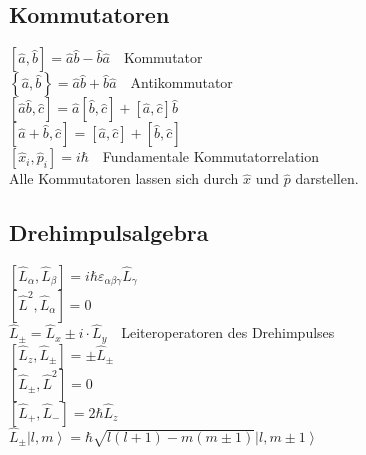\documentclass[8pt,a4paper]{extarticle}
\newcommand{\frml}[2]{$#1$~\hfill~#2\\}
\newcommand{\komut}[2]{\left[#1,#2 \right]}
\newcommand{\antikomut}[2]{\left\{#1,#2\right\}}
\newcommand{\ket}[1]{\left|#1\right\rangle}
\newcommand{\oper}[1]{\hat#1}
\begin{document}
\begin{multicols}{3}
\subsection{Kommutatoren}
\frml{\komut{\oper{a}}{\oper{b}} = \oper{a}\oper{b} - \oper{b}\oper{a}}{Kommutator}
\frml{\antikomut{\oper{a}}{\oper{b}} = \oper{a}\oper{b} + \oper{b}\oper{a}}{Antikommutator}
\frml{\komut{\oper{a}\oper{b}}{\oper{c}}= \oper{a}\komut{\oper{b}}{\oper{c}}+\komut{\oper{a}}{\oper{c}}\oper{b}}{}
\frml{\komut{\oper{a}+\oper{b}}{\oper{c}} = \komut{\oper{a}}{\oper{c}}+\komut{\oper{b}}{\oper{c}}}{}
\frml{\komut{\oper{x}_i}{\oper{p}_i} = i\hbar}{Fundamentale Kommutatorrelation}
Alle Kommutatoren lassen sich durch $\oper{x}$ und $\oper{p}$ darstellen.
\subsection{Drehimpulsalgebra}
\frml{\komut{\oper{L}_\alpha}{\oper{L}_\beta} =  i \hbar \varepsilon_{\alpha\beta\gamma}\oper{L}_\gamma}{}
\frml{\komut{\oper{L}^2}{\oper{L}_\alpha} = 0}{}
\frml{\oper{L}_\pm = \oper{L}_x\pm i\cdot \oper{L}_y}{Leiteroperatoren des Drehimpulses}
\frml{\komut{\oper{L}_z}{\oper{L}_\pm} = \pm\oper{L}_\pm}{}
\frml{\komut{\oper{L}_\pm}{\oper{L}^2}= 0}{}
\frml{\komut{\oper{L}_+}{\oper{L}_-} = 2\hbar \oper{L}_z}{}
\frml{\oper{L}_\pm\ket{l,m} = \hbar\sqrt{l(l+1)-m(m\pm1)}\ket{l,m\pm1}}{}

\end{multicols}
\end{document}
